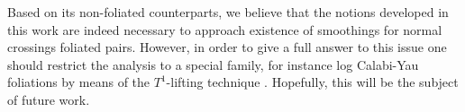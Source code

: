 \documentclass[reqno]{amsart}
\theoremstyle{definition}
\theoremstyle{named}
\begin{document}
Based on its non-foliated counterparts, we believe that the notions developed in this work are indeed necessary to approach existence of smoothings for normal crossings foliated pairs. However, in order to give a full answer to this issue one should restrict the analysis to a special family, for instance log Calabi-Yau foliations by means of the $T^1$-lifting technique \cite{kawamata1994logarithmic}. Hopefully, this will be the subject of future work.

    
    
\end{document}
